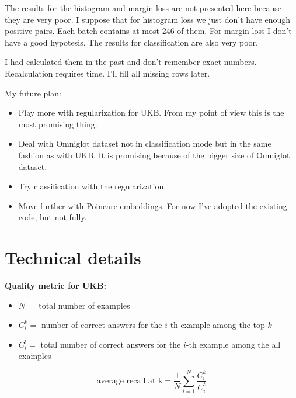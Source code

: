 \documentclass[10pt,a4paper]{article}
\begin{document}
    The results for the histogram and margin loss are not presented here because they are very poor.
    I suppose that for histogram loss we just don't have enough positive pairs. Each batch contains at most 246 of them.
    For margin loss I don't have a good hypotesis.
    The results for classification are also very poor.
    \newline

    I had calculated them in the past and don't remember exact numbers. Recalculation requires time.
    I'll fill all missing rows later.
    \newline

    My future plan:
    \begin{itemize}
        \item {Play more with regularization for UKB. From my point of view this is the most promising thing.}
        \item {Deal with Omniglot dataset not in classification mode but in the same fashion as with UKB. It is promising because of the bigger size
        of Omniglot dataset.}
        \item {Try classification with the regularization.}
        \item {Move further with Poincare embeddings. For now I've adopted the existing code, but not fully.}
    \end{itemize}



    \section{Technical details}\label{sec:technicalDetails}

    \textbf{Quality metric for UKB:}
    \begin{itemize}
        \item{$N = $ total number of examples}
        \item{$C_i^k = $ number of correct answers for the $i$-th example among the top $k$}
        \item{$C_i^t = $ total number of correct answers for the $i$-th example among the all examples}
    \end{itemize}

    \[\text{average recall at k} = \frac{1}{N}\sum_{i = 1}^{N}
    \frac{C_i^k}{C_i^t}\]
\end{document}
